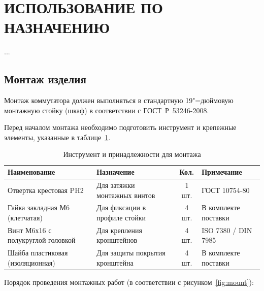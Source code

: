 \documentclass[columnsxxiv,columnsxxvii,pointsubsection]{eskdtext}
\begin{document}
	\maketitle

	\newpage
	\setcounter{section}{1}
	\section{ИСПОЛЬЗОВАНИЕ ПО НАЗНАЧЕНИЮ}

	\par\vspace{6mm}\noindent ...\par\vspace{6mm}

	\setcounter{subsection}{1}
	\subsection{Монтаж изделия}

	\point
	Монтаж коммутатора должен выполняться в стандартную 19"=дюймовую монтажную стойку (шкаф) в соответствии с ГОСТ~Р~53246-2008.

	\point
	Перед началом монтажа необходимо подготовить инструмент и крепежные элементы, указанные в таблице~\ref{tab:mount-tools}.

	\renewcommand{\thetable}{\thesection.\arabic{table}}
	\renewcommand{\thefigure}{\thesection.\arabic{figure}}
	\captionsetup[table]{labelsep=emdash}
	\begin{table}[ht]
		\centering
		\captionsetup{margin=22.5mm}
		\caption{Инструмент и принадлежности для монтажа}\label{tab:mount-tools}
		\begin{tabular}{|l|l|c|l|}
			\hline
	Наименование & Назначение & Кол. & Примечание \T \\ \hline
	Отвертка крестовая PH2 & Для затяжки монтажных винтов & 1 шт. & ГОСТ 10754-80 \\ \hline
	Гайка закладная М6 (клетчатая) & Для фиксации в профиле стойки & 4 шт. & В комплекте поставки \\ \hline
	Винт М6х16 с полукруглой головкой & Для крепления кронштейнов & 4 шт. & ISO 7380 / DIN 7985 \\ \hline
	Шайба пластиковая (изоляционная) & Для защиты покрытия кронштейна & 4 шт. & В комплекте поставки \\ \hline
		\end{tabular}
	\end{table}

	\point
	Порядок проведения монтажных работ (в соответствии с рисунком~\ref{fig:mount}):
\end{document}

